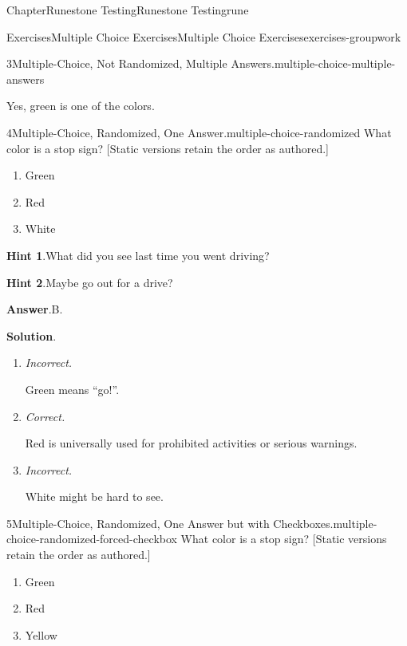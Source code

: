 \documentclass[oneside,10pt,]{book}
\newcommand{\blocktitlefont}{\relax}
\newcommand{\lititle}[1]{{\slshape#1}}
\numberwithin{equation}{section}
\begin{document}
\begin{chapterptx}{Chapter}{Runestone Testing}{}{Runestone Testing}{}{}{rune}
\begin{exercises-section}{Exercises}{Multiple Choice Exercises}{}{Multiple Choice Exercises}{}{}{exercises-groupwork}
\begin{divisionexercise}{3}{Multiple-Choice, Not Randomized, Multiple Answers.}{}{multiple-choice-multiple-answers}
\begin{enumerate}[label={\Alph*.}]
Yes, green is one of the colors.%
\end{enumerate}
%
\end{divisionexercise}%
\begin{divisionexercise}{4}{Multiple-Choice, Randomized, One Answer.}{}{multiple-choice-randomized}%
%
What color is a stop sign? [Static versions retain the order as authored.]%
\par
%
\begin{enumerate}[label={\Alph*.}]
\item{}Green%
\item{}Red%
\item{}White%
\end{enumerate}
%
\par\smallskip%
\noindent\textbf{\blocktitlefont Hint 1}.\hypertarget{multiple-choice-randomized-4}{}\quad{}What did you see last time you went driving?%
\par\smallskip%
\noindent\textbf{\blocktitlefont Hint 2}.\hypertarget{multiple-choice-randomized-5}{}\quad{}Maybe go out for a drive?%
\par\smallskip%
\noindent\textbf{\blocktitlefont Answer}.\hypertarget{multiple-choice-randomized-6}{}\quad{}B.%
\par\smallskip%
\noindent\textbf{\blocktitlefont Solution}.\hypertarget{multiple-choice-randomized-7}{}\quad{}%
\begin{enumerate}[label={\Alph*.}]
\item{}\lititle{Incorrect.}\par%
Green means ``go!''.%
\item{}\lititle{Correct.}\par%
Red is universally used for prohibited activities or serious warnings.%
\item{}\lititle{Incorrect.}\par%
White might be hard to see.%
\end{enumerate}
%
\end{divisionexercise}%
\begin{divisionexercise}{5}{Multiple-Choice, Randomized, One Answer but with Checkboxes.}{}{multiple-choice-randomized-forced-checkbox}%
%
What color is a stop sign? [Static versions retain the order as authored.]%
\par
%
\begin{enumerate}[label={\Alph*.}]
\item{}Green%
\item{}Red%
\item{}Yellow%

\end{enumerate}
\end{divisionexercise}
\end{exercises-section}
\end{chapterptx}
\end{document}
